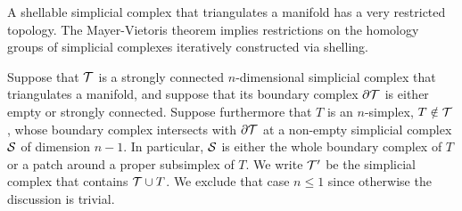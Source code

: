 \documentclass[a4paper]{amsart}
\begin{document}
\begin{remark}
    A shellable simplicial complex that triangulates a manifold has a very restricted topology. 
    The Mayer-Vietoris theorem implies restrictions on the homology groups of simplicial complexes iteratively constructed via shelling. 

    Suppose that ${\mathcal T}$ is a strongly connected $n$-dimensional simplicial complex that triangulates a manifold, and suppose that its boundary complex $\partial{\mathcal T}$ is either empty or strongly connected.  
    Suppose furthermore that $T$ is an $n$-simplex, $T \notin {\mathcal T}$, whose boundary complex intersects with $\partial{\mathcal T}$ at a non-empty simplicial complex ${\mathcal S}$ of dimension $n-1$. In particular, ${\mathcal S}$ is either the whole boundary complex of $T$ or a patch around a proper subsimplex of $T$. We write ${\mathcal T}'$ be the  simplicial complex that contains ${\mathcal T} \cup T$.
    We exclude that case $n \leq 1$ since otherwise the discussion is trivial.
    

\end{remark}
\end{document}
